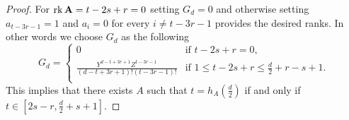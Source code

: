 \documentclass[12pt]{amsart}
\numberwithin{equation}{section}
\theoremstyle{plain} \newtheorem{theorem}{Theorem}[section]
\theoremstyle{definition} \newtheorem{definition}[theorem]{Definition}
\begin{document}
\begin{proof}
For $\operatorname{rk}\mathbf{A}=t-2s+r=0$ setting $G_d=0$ and  otherwise setting  $a_{t-3r-1}=1$ and $a_i=0$ for every $i\neq t-3r-1$ provides the desired ranks. In other words we choose $G_d$ as the following
\begin{equation}\label{G_(d)even(1)}
G_{d}=\left\{
                \begin{array}{ll}
                  0 & \text{if $t-2s+r=0$},\\
                  \frac{Y^{d-t+3r+1}Z^{t-3r-1}}{(d-t+3r+1)!(t-3r-1)!} & \text{if $1\leq t-2s+r\leq \frac{d}{2}+r-s+1.$}\\
                \end{array}
              \right.
\end{equation}
This implies that there exists $A$ such that $t=h_A(\frac{d}{2})$ if and only if 
$t\in [2s-r,\frac{d}{2}+s+1]$.


\end{proof}
\end{document}
